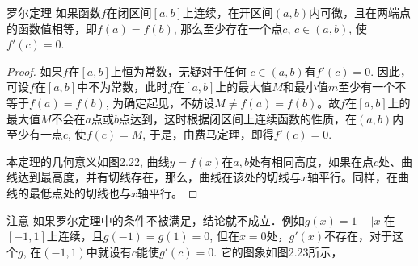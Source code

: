 \begin{blk}
  {罗尔定理} 如果函数$f$在闭区间$[a,b]$上连续，在开区间$(a,b)$内可微，且在两端点的函数值相等，即$f(a)=f(b)$, 那么至少存在一个点$c$, $c\in (a,b)$, 使$f'(c)=0$.  
\end{blk}

\begin{proof}
如果$f$在$[a,b]$上恒为常数，无疑对于任何
$c\in (a,b)$有$f'(c)=0$. 因此，可设$f$在$[a,b]$中不为常数，此时$f$在$[a,b]$上的最大值$M$和最小值$m$至少有一个不等于$f(a)=f(b)$, 为确定起见，不妨设$M\ne f(a)=f(b)$。故$f$在$[a,b]$上的最大值$M$不会在$a$点或$b$点达到，这时根据闭区间上连续函数的性质，在$(a,b)$内至少有一点$c$, 使$f(c)=M$, 于是，由费马定理，即得$f'(c)=0$. 

本定理的几何意义如图2.22, 曲线$y=f(x)$在$a,b$处有相同高度，如果在点$c$处、曲线达到最高度，并有切线存在，那么，曲线在该处的切线与$x$轴平行。同样，在曲线的最低点处的切线也与$x$轴平行。
\end{proof}

\begin{figure}[htp]
    \centering
    \begin{minipage}[t]{0.48\textwidth}
    \centering
{}
    \caption{}
    \end{minipage}
    \begin{minipage}[t]{0.48\textwidth}
    \centering
    \caption{}
    \end{minipage}
    \end{figure}


\begin{rmk}
    注意 如果罗尔定理中的条件不被满足，结论就不成立．例如$g(x)=1-|x|$在$[-1, 1]$上连续，且$g(-1)=g(1)=0$, 但在$x=0$处，$g'(x)$不存在，对于这个$g$, 在$(-1,1)$中就设有$c$能使$g'(c)=0$. 它的图象如图2.23所示，
\end{rmk}

